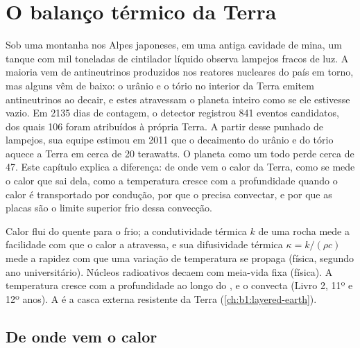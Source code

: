 \chapter{O balanço térmico da Terra}\label{ch:b1:heat-budget}

Sob uma montanha nos Alpes japoneses, em uma antiga cavidade de mina, um tanque com mil toneladas de cintilador líquido observa lampejos fracos de luz. A maioria vem de antineutrinos produzidos nos reatores nucleares do país em torno,
mas alguns vêm de baixo: o urânio e o tório no interior da Terra emitem antineutrinos ao decair, e estes atravessam o planeta inteiro como se ele estivesse vazio. Em 2135 dias de contagem, o detector registrou 841 eventos candidatos, dos quais 106 foram atribuídos à própria Terra. A partir desse punhado de lampejos, sua equipe estimou em 2011 que o decaimento do urânio e do tório aquece a Terra em cerca de 20 terawatts. O planeta como um todo perde cerca de 47. Este capítulo explica a diferença: de onde vem o calor da Terra, como se mede o calor que sai dela, como a temperatura cresce com a profundidade quando o calor é transportado por condução, por que o  precisa convectar, e por que as placas são o limite superior frio dessa convecção.

\begin{recall}
Calor flui do quente para o frio; a condutividade térmica $k$ de uma rocha mede a facilidade com que o calor a atravessa, e sua difusividade térmica $\kappa = k/(\rho c)$ mede a rapidez com que uma variação de temperatura se propaga (física, segundo ano universitário). Núcleos radioativos decaem com meia-vida fixa (física). A temperatura cresce com a profundidade ao longo do , e o  convecta (Livro 2, 11º e 12º anos). A  é a casca externa resistente da Terra (\cref{ch:b1:layered-earth}).
\end{recall}

\section{De onde vem o calor}

